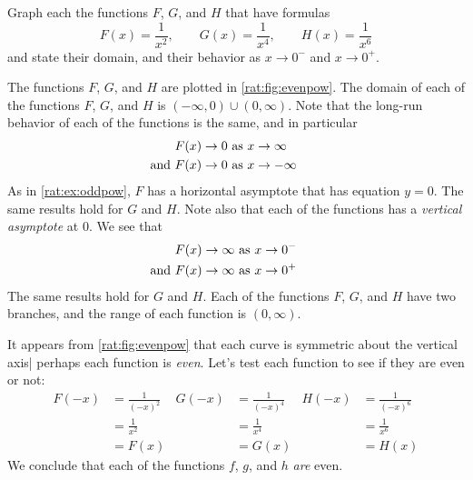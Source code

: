 \begin{pccexample}\label{rat:ex:evenpow}%
	Graph each the functions $F$, $G$, and $H$ that 
	have formulas
	\[
		F(x)=\frac{1}{x^2},\qquad G(x)=\frac{1}{x^4},\qquad H(x)=\frac{1}{x^6}
	\]
	and state their domain, and their behavior as $x\rightarrow 0^-$ and $x\rightarrow 0^+$.
	\begin{pccsolution}
		The functions $F$, $G$, and $H$ are plotted in \cref{rat:fig:evenpow}.
		The domain of each of the functions $F$, $G$, and $H$ is $(-\infty,0)\cup (0,\infty)$. Note that 
		the long-run behavior of each of the functions is the same, and in particular
		\begin{align*}
			F(x)\rightarrow 0                           & \text{ as } x\rightarrow\infty  \\ 
			\mathllap{\text{and }}    F(x)\rightarrow 0 & \text{ as } x\rightarrow-\infty 
		\end{align*}
		As in \cref{rat:ex:oddpow}, $F$ has a horizontal asymptote  that 
		has equation $y=0$.
		The same results hold for $G$ and $H$. Note also that each of the functions
		has a \emph{vertical asymptote} at $0$. We see that
		\begin{align*}
			F(x)\rightarrow \infty                          & \text{ as } x\rightarrow 0^- \\ 
			\mathllap{\text{and }}   F(x)\rightarrow \infty & \text{ as } x\rightarrow 0^+ 
		\end{align*}
		The same results hold for $G$ and $H$. Each of the functions $F$, $G$, and $H$ 
		have two branches, and the range of each function is $(0,\infty)$.
		
		It appears from \cref{rat:fig:evenpow} that each curve is symmetric
		about the vertical axis| perhaps each function is \emph{even}. 
		Let's test each function to see if they are even or not:
		\begin{align*}
			F(-x) & =\frac{1}{(-x)^2} & G(-x) & =\frac{1}{(-x)^4} & H(-x) & =\frac{1}{(-x)^6} \\ 
			      & =\frac{1}{x^2}    &       & =\frac{1}{x^4}    &       & =\frac{1}{x^6}    \\    
			      & =F(x)             &       & =G(x)             &       & =H(x)             
		\end{align*}
		We conclude that each of the functions $f$, $g$, and $h$ \emph{are} even.
	\end{pccsolution}
\end{pccexample}

